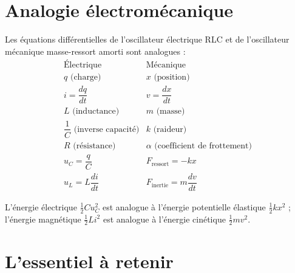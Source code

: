 \section{Analogie électromécanique}

\begin{propriete}[Analogie]
Les équations différentielles de l’oscillateur électrique RLC et de l’oscillateur mécanique masse-ressort amorti sont analogues :
\[
\begin{array}{c|c}
\text{Électrique} & \text{Mécanique} \\ \hline
q \text{ (charge)} & x \text{ (position)} \\
i = \dfrac{dq}{dt} & v = \dfrac{dx}{dt} \\
L \text{ (inductance)} & m \text{ (masse)} \\
\dfrac{1}{C} \text{ (inverse capacité)} & k \text{ (raideur)} \\
R \text{ (résistance)} & \alpha \text{ (coefficient de frottement)} \\
u_C = \dfrac{q}{C} & F_{\text{ressort}} = -k x \\
u_L = L \dfrac{di}{dt} & F_{\text{inertie}} = m \dfrac{dv}{dt}
\end{array}
\]
\end{propriete}

\begin{aretenir}
L’énergie électrique $\frac{1}{2} C u_C^2$ est analogue à l’énergie potentielle élastique $\frac{1}{2} k x^2$ ; l’énergie magnétique $\frac{1}{2} L i^2$ est analogue à l’énergie cinétique $\frac{1}{2} m v^2$.
\end{aretenir}

\section{L’essentiel à retenir}

